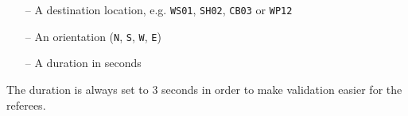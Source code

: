 \begin{itemize}
	\item[--] A destination location, e.g. \texttt{WS01}, \texttt{SH02}, \texttt{CB03} or \texttt{WP12}
	\item[--] An orientation (\texttt{N}, \texttt{S}, \texttt{W}, \texttt{E})
	\item[--] A duration in seconds
\end{itemize}

The duration is always set to 3 seconds in order to make validation easier for the referees.
%
%
%
%
%
%
%
%
%
